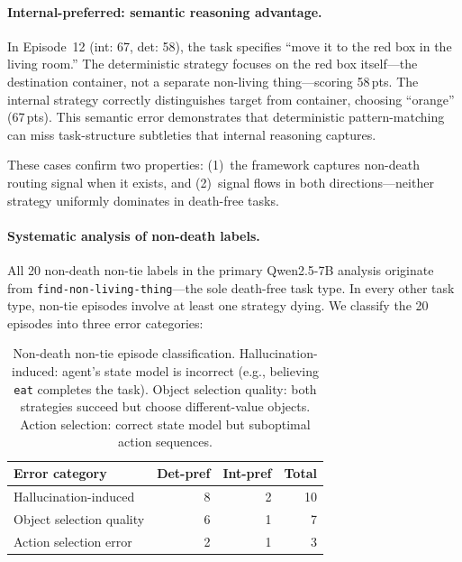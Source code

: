 \documentclass[11pt]{article}
\begin{document}
\paragraph{Internal-preferred: semantic reasoning advantage.}
In Episode~12 (int: 67, det: 58), the task specifies ``move it to the red box in the living room.'' The deterministic strategy focuses on the red box itself---the destination container, not a separate non-living thing---scoring 58\,pts. The internal strategy correctly distinguishes target from container, choosing ``orange'' (67\,pts). This semantic error demonstrates that deterministic pattern-matching can miss task-structure subtleties that internal reasoning captures.

These cases confirm two properties: (1)~the framework captures non-death routing signal when it exists, and (2)~signal flows in both directions---neither strategy uniformly dominates in death-free tasks.

\paragraph{Systematic analysis of non-death labels.}
All 20 non-death non-tie labels in the primary Qwen2.5-7B analysis originate from \texttt{find-non-living-thing}---the sole death-free task type. In every other task type, non-tie episodes involve at least one strategy dying. We classify the 20 episodes into three error categories:

\begin{table}[h]
\centering
\small
\begin{tabular}{@{}lrrr@{}}
\toprule
Error category & Det-pref & Int-pref & Total \\
\midrule
Hallucination-induced & 8 & 2 & 10 \\
Object selection quality & 6 & 1 & 7 \\
Action selection error & 2 & 1 & 3 \\
\bottomrule
\end{tabular}
\caption{Non-death non-tie episode classification. Hallucination-induced: agent's state model is incorrect (e.g., believing \texttt{eat} completes the task). Object selection quality: both strategies succeed but choose different-value objects. Action selection: correct state model but suboptimal action sequences.}
\label{tab:non-death-taxonomy}
\end{table}
\end{document}
